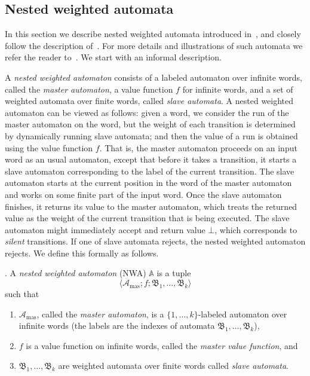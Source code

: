 \documentclass{lmcs}
\newcommand{\Paragraph}[1]{\noindent{\textbf{#1}}}
\newcommand{\masterA}{\mathcal{A}_{\textrm{mas}}}
\newcommand{\nestedA}{\mathbb{A}}
\newcommand{\slaveA}{{\mathfrak{B}}}
\newcommand{\tuple}[1]{\langle#1\rangle}
\begin{document}
\subsection{Nested weighted automata}
In this section we describe nested weighted automata introduced in~\cite{nested},
and closely follow the description of~\cite{nested}.
For more details and illustrations of such automata we refer the reader
to~\cite{nested}.
We start with an informal description.


\smallskip
{}
A \emph{nested weighted automaton} consists of a labeled automaton over infinite words,
called the \emph{master automaton}, a value function $f$ for infinite words,
and a set of weighted automata over finite words, called \emph{slave automata}.
A nested weighted automaton can be viewed as follows:
given a word, we consider the run of the master automaton on the word,
but the weight of each transition is determined by dynamically running
slave automata; and then the value of a run is obtained using the
value function $f$.
That is, the master automaton proceeds on an input word as an usual automaton,
except that before it takes a transition, it starts a slave automaton
corresponding to the label of the current transition.
The slave automaton starts at the current position in the word of the master automaton
and works on some finite part of the input word. Once the slave automaton finishes,
it returns its value to the master automaton, which treats the returned
value as the weight of the current transition that is being executed.
The slave automaton might immediately accept and return value $\bot$,
which corresponds to \emph{silent} transitions.
If one of slave automata rejects, the nested weighted automaton rejects.
We define this formally as follows.

\smallskip

\Paragraph{Nested weighted automata}.
A \emph{nested weighted automaton} (NWA) $\nestedA$ is a tuple
\[
    \tuple{\masterA; f; \slaveA_1, \ldots, \slaveA_k}
\]
such that

\begin{enumerate}
\item $\masterA$, called the \emph{master automaton}, is a $\{1, \ldots, k\}$-labeled automaton over infinite words
(the labels are the indexes of automata $\slaveA_1,  \ldots, \slaveA_k$),
\item $f$ is a value function on infinite words, called the \emph{master value function}, and
\item $\slaveA_1, \ldots, \slaveA_k$ are weighted automata over finite words called \emph{slave automata}.
\end{enumerate}
\smallskip
\end{document}
